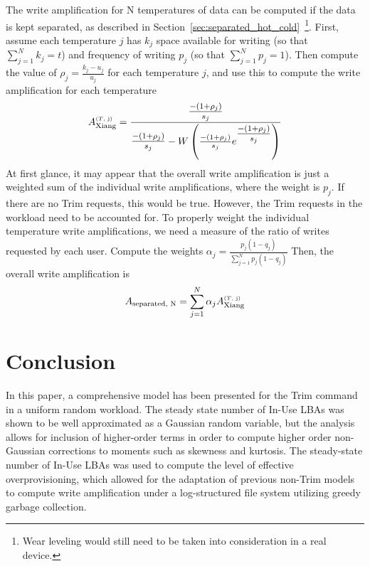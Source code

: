 \documentclass[prodmode,acmtos]{acmsmall}
\begin{document}
The write amplification for N temperatures of data can be computed if the data is kept separated, as described in Section~\ref{sec:separated_hot_cold}~\footnote{Wear leveling would still need to be taken into consideration in a real device.}.  First, assume each temperature $j$ has $k_j$ space available for writing (so that $\sum_{j=1}^N k_j=t$) and frequency of writing $p_j$ (so that $\sum_{j=1}^N p_j=1$).  Then compute the value of $\rho_j = \frac{k_j - u_j}{u_j}$ for each temperature $j$, and use this to compute the write amplification for each temperature
\begin{equation*}
A_\text{Xiang}^{\text{\tiny ($T$, j)}} = \frac{\text{\large${\frac{-(1+\rho_j)}{s_j}}$}} {\text{\large${\frac{-(1+\rho_j)}{s_j}}$} - W\left(\frac{-(1+\rho_j)}{s_j} e^\text{\large${\frac{-(1+\rho_j)}{s_j}}$}\right)}
\end{equation*}
At first glance, it may appear that the overall write amplification is just a weighted sum of the individual write amplifications, where the weight is $p_j$.  If there are no Trim requests, this would be true.  However, the Trim requests in the workload need to be accounted for.  To properly weight the individual temperature write amplifications, we need a measure of the ratio of writes requested by each user.  Compute the weights $\alpha_j = \frac{p_j(1-q_j)}{\sum_{j=1}^N p_j(1-q_j)}$
Then, the overall write amplification is
\begin{equation*}
A_\text{separated, N} = \sum_{j=1}^N \alpha_j A_\text{Xiang}^{\text{\tiny ($T$, j)}}
\end{equation*}








\section{Conclusion}
In this paper, a comprehensive model has been presented for the Trim command in a uniform random workload.  The steady state number of In-Use LBAs was shown to be well approximated as a Gaussian random variable, but the analysis allows for inclusion of higher-order terms in order to compute higher order non-Gaussian corrections to moments such as skewness and kurtosis.  The steady-state number of In-Use LBAs was used to compute the level of effective overprovisioning, which allowed for the adaptation of previous non-Trim models to compute write amplification under a log-structured file system utilizing greedy garbage collection.
\end{document}
